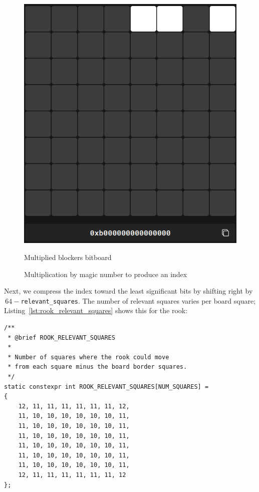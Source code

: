 \begin{figure}[H]
\begin{minipage}[c]{0.4\textwidth}
        \includegraphics[width=\textwidth]{Imagenes/magics_multiplied_blockers.png}
        \caption*{Multiplied blockers bitboard}
    \end{minipage}
    \caption{Multiplication by magic number to produce an index}
    \label{fig:magic_multiplication}
\end{figure}

\noindent Next, we compress the index toward the least significant bits by shifting right by \(\,64-\)\texttt{relevant\_squares}. The number of relevant squares varies per board square; Listing~\ref{lst:rook_relevant_squares} shows this for the rook:

\begin{lstlisting}[breaklines=true, caption={Number of relevant squares for each rook square}, label={lst:rook_relevant_squares}]
/**
 * @brief ROOK_RELEVANT_SQUARES
 * 
 * Number of squares where the rook could move
 * from each square minus the board border squares.
 */
static constexpr int ROOK_RELEVANT_SQUARES[NUM_SQUARES] =
{
    12, 11, 11, 11, 11, 11, 11, 12,
    11, 10, 10, 10, 10, 10, 10, 11,
    11, 10, 10, 10, 10, 10, 10, 11,
    11, 10, 10, 10, 10, 10, 10, 11,
    11, 10, 10, 10, 10, 10, 10, 11,
    11, 10, 10, 10, 10, 10, 10, 11,
    11, 10, 10, 10, 10, 10, 10, 11,
    12, 11, 11, 11, 11, 11, 11, 12
};
\end{lstlisting}

